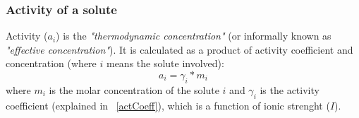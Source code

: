 









\subsubsection{Activity of a solute}\label{activity}
Activity ($a_i$) is the \emph{"thermodynamic concentration"} (or informally known as \emph{"effective concentration"}). It is calculated as a product of activity coefficient and concentration (where $i$ means the solute involved):
\begin{equation}\label{activityEq}
a_i = \gamma_i * m_i
\end{equation}
where $m_i$ is the molar concentration of the solute $i$ and $\gamma_i$ is the activity coefficient (explained in ~\ref{actCoeff}), which is a function of ionic strenght ($I$).

